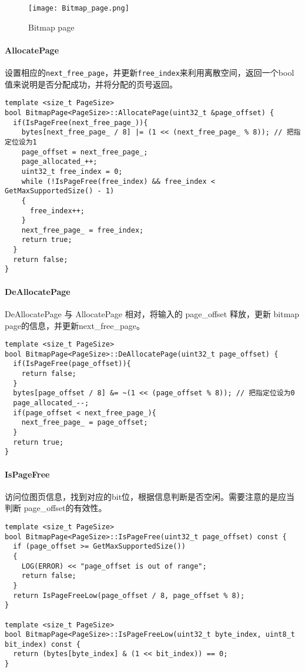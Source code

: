 \documentclass[12pt,hyperref,a4paper,UTF8]{ctexart}
\begin{document}
\begin{figure}[h]
    \centering
    \texttt{[image: Bitmap\_page.png]}
    \caption{Bitmap page}
    \label{fig:bitmap}
\end{figure}

\paragraph{AllocatePage}
设置相应的\verb|next_free_page|，并更新\verb|free_index|来利用离散空间，返回一个bool值来说明是否分配成功，并将分配的页号返回。
\begin{verbatim}
template <size_t PageSize>
bool BitmapPage<PageSize>::AllocatePage(uint32_t &page_offset) { 
  if(IsPageFree(next_free_page_)){
    bytes[next_free_page_ / 8] |= (1 << (next_free_page_ % 8)); // 把指定位设为1
    page_offset = next_free_page_;
    page_allocated_++;
    uint32_t free_index = 0;
    while (!IsPageFree(free_index) && free_index < GetMaxSupportedSize() - 1)
    {
      free_index++;
    }
    next_free_page_ = free_index;
    return true;
  }
  return false;
}
\end{verbatim}

\paragraph{DeAllocatePage}
DeAllocatePage 与 AllocatePage 相对，将输入的 page\_offset 释放，更新 bitmap page的信息，并更新next\_free\_page。
\begin{verbatim}
template <size_t PageSize>
bool BitmapPage<PageSize>::DeAllocatePage(uint32_t page_offset) {
  if(IsPageFree(page_offset)){
    return false;
  }
  bytes[page_offset / 8] &= ~(1 << (page_offset % 8)); // 把指定位设为0
  page_allocated_--;
  if(page_offset < next_free_page_){
    next_free_page_ = page_offset;
  }
  return true;
}
\end{verbatim}

\paragraph{IsPageFree}
访问位图页信息，找到对应的bit位，根据信息判断是否空闲。需要注意的是应当判断 page\_offset的有效性。
\begin{verbatim}
template <size_t PageSize>
bool BitmapPage<PageSize>::IsPageFree(uint32_t page_offset) const {
  if (page_offset >= GetMaxSupportedSize())
  {
    LOG(ERROR) << "page_offset is out of range";
    return false;
  }
  return IsPageFreeLow(page_offset / 8, page_offset % 8);
}

template <size_t PageSize>
bool BitmapPage<PageSize>::IsPageFreeLow(uint32_t byte_index, uint8_t bit_index) const {
  return (bytes[byte_index] & (1 << bit_index)) == 0;
}
\end{verbatim}
\end{document}
